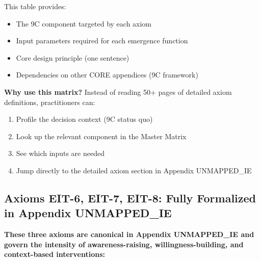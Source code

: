 This table provides:
\begin{itemize}[nosep]
\item The 9C component targeted by each axiom
\item Input parameters required for each emergence function
\item Core design principle (one sentence)
\item Dependencies on other CORE appendices (9C framework)
\end{itemize}

\textbf{Why use this matrix?} Instead of reading 50+ pages of detailed axiom definitions, practitioners can:
\begin{enumerate}[nosep]
\item Profile the decision context (9C status quo)
\item Look up the relevant component in the Master Matrix
\item See which inputs are needed
\item Jump directly to the detailed axiom section in Appendix UNMAPPED_IE
\end{enumerate}

\subsection{Axioms EIT-6, EIT-7, EIT-8: Fully Formalized in Appendix UNMAPPED_IE}

\textbf{These three axioms are canonical in Appendix UNMAPPED_IE and govern the intensity of awareness-raising, willingness-building, and context-based interventions:}

